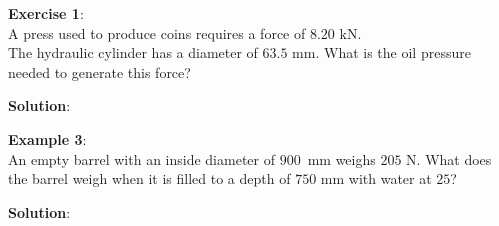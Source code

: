 \documentclass[10pt]{amsart}
\begin{document}
\begin{minipage}[t]{0.45\textwidth}
	\raggedright
	\textbf{Exercise 1}:\\
		A press used to produce coins requires a force of $8.20\text{ kN}$.\\
		The hydraulic cylinder has
		a diameter of $63.5\text{ mm}$. \parb
		What is the oil pressure needed to generate this force?
	\par\vspace{3.25cm}
\end{minipage}
\hfill
\begin{minipage}[t]{0.5\textwidth}
	\textbf{Solution}:
\end{minipage}
\vfill
\newpage
\begin{minipage}[t]{0.4\textwidth}
\raggedright
\textbf{Example 3}:\\
An empty barrel with an inside diameter of $900$~mm weighs $205$ N. \parb
What does the barrel weigh when it is filled to a depth of $750$ mm
with water at $25$\textcelsius{}?
\par\vspace{9cm}
\end{minipage}
\hfill
\begin{minipage}[t]{0.55\textwidth}

\textbf{Solution}:
\parb
\end{minipage}
\end{document}
